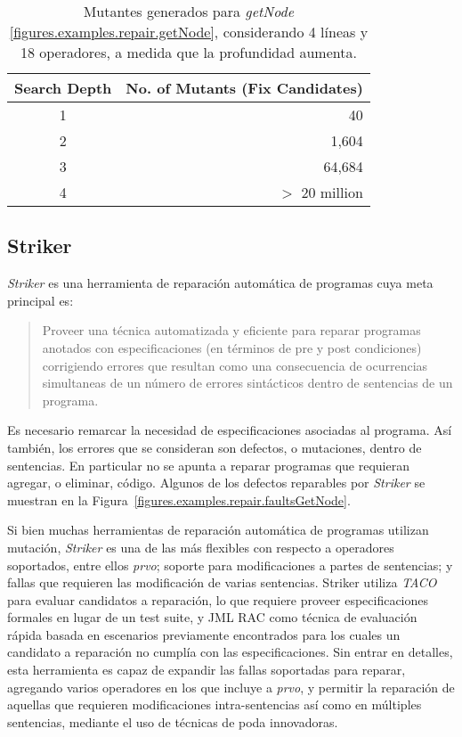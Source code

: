 \begin{table}[t]
	\begin{center}
		\small
		\begin{tabular}{c r}
			Search Depth                            &	No. of Mutants (Fix Candidates)        \\
			\hline
			1 					&	40		                               	\\
			2 					&	1,604			                \\
			3 					&	64,684		        	        \\
			4 					&	$>$ 20 million		                
		\end{tabular}
		\normalsize
	\end{center}
	\caption{Mutantes generados para \emph{getNode} \ref{figures.examples.repair.getNode}, considerando 4 l\'ineas y 18 operadores, a medida que la profundidad aumenta.}
	\label{tables.repair.mutation.explosion}
\end{table}


\subsection{Striker}
\label{sec:repair.striker}

\emph{Striker} es una herramienta de reparaci\'on autom\'atica de programas cuya meta principal es:
\begin{quote}
	Proveer una t\'ecnica automatizada y eficiente para reparar programas anotados con especificaciones (en t\'erminos de pre y post condiciones) corrigiendo errores que resultan como una consecuencia de ocurrencias simultaneas de un n\'umero de errores sint\'acticos dentro de sentencias de un programa.
\end{quote}
Es necesario remarcar la necesidad de especificaciones asociadas al programa. As\'i tambi\'en, los errores que se consideran son defectos, o mutaciones, dentro de sentencias. En particular no se apunta a reparar programas que requieran agregar, o eliminar, c\'odigo. Algunos de los defectos reparables por \emph{Striker} se muestran en la Figura~\ref{figures.examples.repair.faultsGetNode}.

Si bien muchas herramientas de reparaci\'on autom\'atica de programas utilizan mutaci\'on, \emph{Striker} es una de las m\'as flexibles con respecto a operadores soportados, entre ellos \emph{prvo}; soporte para modificaciones a partes de sentencias; y fallas que requieren las modificaci\'on de varias sentencias. Striker utiliza \emph{TACO} \cite{bibliography.mutation.tools.TACOGaleottiRPF13} para evaluar candidatos a reparaci\'on, lo que requiere proveer especificaciones formales en lugar de un test suite, y JML RAC \cite{bibliography.misc.JMLRAC.LeavensCCRC02} como t\'ecnica de evaluaci\'on r\'apida basada en escenarios previamente encontrados para los cuales un candidato a reparaci\'on no cumpl\'ia con las especificaciones. Sin entrar en detalles, esta herramienta es capaz de expandir las fallas soportadas para reparar, agregando varios operadores en los que incluye a \emph{prvo}, y permitir la reparaci\'on de aquellas que requieren modificaciones intra-sentencias as\'i como en m\'ultiples sentencias, mediante el uso de t\'ecnicas de poda innovadoras.

